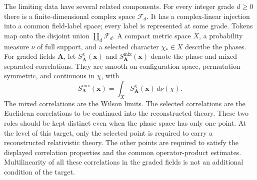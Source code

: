 The limiting data have several related components. For every integer grade
\(d\ge0\) there is a finite-dimensional complex space \(\mathcal F_d\).
It has a complex-linear injection into a common field-label space; every label is
represented at some grade. Tokens map onto the disjoint union
\(\coprod_d\mathcal F_d\). A compact metric space \(X\), a probability
measure \(\nu\) of full support, and a selected character \(\chi_*\in X\)
describe the phases. For graded fields \(\boldsymbol A\), let
\(S^{\chi}_{\boldsymbol A}(\boldsymbol x)\) and
\(S^{\mathrm{mix}}_{\boldsymbol A}(\boldsymbol x)\) denote the phase and
mixed separated correlations. They are smooth on configuration space,
permutation symmetric, and continuous in \(\chi\), with
\begin{equation}\label{ex-mixture}
 S^{\mathrm{mix}}_{\boldsymbol A}(\boldsymbol x)
   =\int_X S^{\chi}_{\boldsymbol A}(\boldsymbol x)\,d\nu(\chi).
\end{equation}
The mixed correlations are the Wilson limits. The selected correlations
are the Euclidean correlations to be continued into the reconstructed theory.
These two roles should be kept distinct even when the phase space has only
one point. At the level of this target, only the selected point is required
to carry a reconstructed relativistic theory. The other points are required
to satisfy the displayed correlation properties and the common
operator-product estimates. Multilinearity of all these correlations in the
graded fields is not an additional condition of the target.

